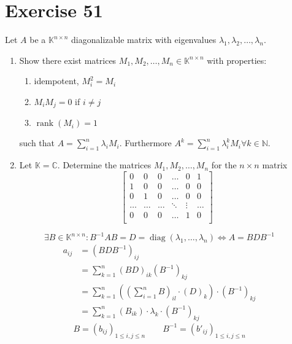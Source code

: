 \documentclass[a4paper]{article}
\theoremstyle{definition}
\begin{document}
\section{Exercise 51}
\begin{ex}
  Let $A$ be a $\mathbb K^{n\times n}$ diagonalizable matrix with eigenvalues $\lambda_1, \lambda_2, \dots, \lambda_n$.
  \begin{enumerate}
    \item Show there exist matrices $M_1, M_2, \dots, M_n \in \mathbb K^{n\times n}$ with properties:
      \begin{enumerate}
        \item idempotent, $M_i^2 = M_i$
        \item $M_i M_j = 0$ if $i \neq j$
        \item $\operatorname{rank}(M_i) = 1$
      \end{enumerate}
      such that $A = \sum_{i=1}^n \lambda_i M_i$. Furthermore $A^k = \sum_{i=1}^n \lambda_i^k M_i \forall k \in \mathbb N$.
    \item Let $\mathbb K = \mathbb C$. Determine the matrices $M_1, M_2, \dots, M_n$ for the $n\times n$ matrix
      \[
        \begin{bmatrix}
          0 & 0 & 0 & \dots & 0 & 1 \\
          1 & 0 & 0 & \dots & 0 & 0 \\
          0 & 1 & 0 & \dots & 0 & 0 \\
          \ldots & \ldots & \ldots & \ddots & \vdots & \ldots \\
          0 & 0 & 0 & \dots & 1 & 0 \\
        \end{bmatrix}
      \]
  \end{enumerate}
\end{ex}

\[ \exists B \in \mathbb K^{n\times n}: B^{-1} AB = D = \operatorname{diag}(\lambda_1, \dots, \lambda_n) \iff A = BDB^{-1} \]
\begin{align*}
  a_{ij} &= (BDB^{-1})_{ij} \\
         &= \sum_{k=1}^n (BD)_{ik} (B^{-1})_{kj} \\
         &= \sum_{k=1}^n \left((\sum_{i=1}^n B)_{il} \cdot (D)_k\right) \cdot (B^{-1})_{kj} \\
         &= \sum_{k=1}^n (B_{ik}) \cdot \lambda_k \cdot (B^{-1})_{kj}
\end{align*}
\[ B = (b_{ij})_{1 \leq i, j \leq n} \qquad B^{-1} = (b'_{ij})_{1 \leq i,j \leq n} \]
\end{document}
